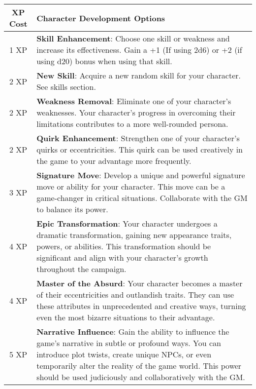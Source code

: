 \documentclass{article}
\begin{document}
\begin{table}[h]
  \centering
  \begin{tabularx}{\textwidth}{|c|X|}
    \toprule
    \textbf{XP Cost} & \textbf{Character Development Options} \\
    \midrule
    1 XP & \textbf{Skill Enhancement}: Choose one skill or weakness and increase its effectiveness. Gain a +1 (If using 2d6) or +2 (if using d20) bonus when using that skill. \\ \midrule
    2 XP & \textbf{New Skill}: Acquire a new random skill for your character. See skills section. \\ \midrule
    2 XP & \textbf{Weakness Removal}: Eliminate one of your character's weaknesses. Your character's progress in overcoming their limitations contributes to a more well-rounded persona. \\ \midrule
    2 XP & \textbf{Quirk Enhancement}: Strengthen one of your character's quirks or eccentricities. This quirk can be used creatively in the game to your advantage more frequently. \\ \midrule
    3 XP & \textbf{Signature Move}: Develop a unique and powerful signature move or ability for your character. This move can be a game-changer in critical situations. Collaborate with the GM to balance its power. \\ \midrule
    4 XP & \textbf{Epic Transformation}: Your character undergoes a dramatic transformation, gaining new appearance traits, powers, or abilities. This transformation should be significant and align with your character's growth throughout the campaign. \\ \midrule
    4 XP & \textbf{Master of the Absurd}: Your character becomes a master of their eccentricities and outlandish traits. They can use these attributes in unprecedented and creative ways, turning even the most bizarre situations to their advantage. \\ \midrule
    5 XP & \textbf{Narrative Influence}: Gain the ability to influence the game's narrative in subtle or profound ways. You can introduce plot twists, create unique NPCs, or even temporarily alter the reality of the game world. This power should be used judiciously and collaboratively with the GM. \\
    \bottomrule
  \end{tabularx}
\end{table}
\end{document}
